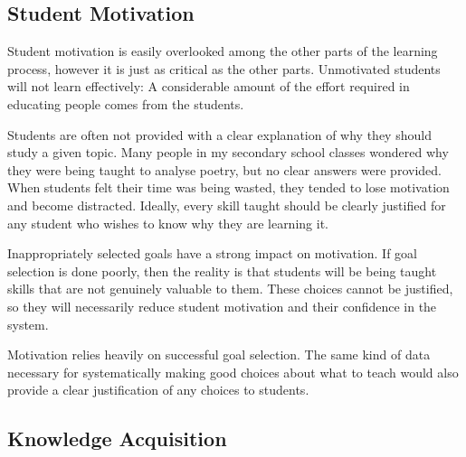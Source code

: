     \subsection{Student Motivation}
      Student motivation is easily overlooked among the other parts of the learning process, however it is just as critical as the other parts. Unmotivated students will not learn effectively: A considerable amount of the effort required in educating people comes from the students.

      Students are often not provided with a clear explanation of why they should study a given topic. Many people in my secondary school classes wondered why they were being taught to analyse poetry, but no clear answers were provided. When students felt their time was being wasted, they tended to lose motivation and become distracted. Ideally, every skill taught should be clearly justified for any student who wishes to know why they are learning it.

      Inappropriately selected goals have a strong impact on motivation. If goal selection is done poorly, then the reality is that students will be being taught skills that are not genuinely valuable to them. These choices cannot be justified, so they will necessarily reduce student motivation and their confidence in the system.

      Motivation relies heavily on successful goal selection. The same kind of data necessary for systematically making good choices about what to teach would also provide a clear justification of any choices to students.


    \subsection{Knowledge Acquisition}

